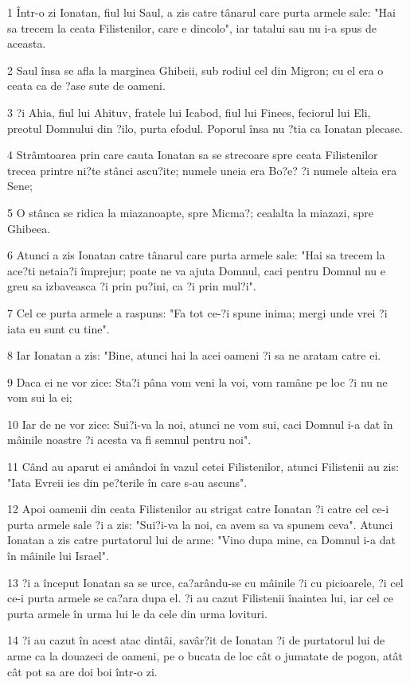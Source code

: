\par 1 Într-o zi Ionatan, fiul lui Saul, a zis catre tânarul care purta armele sale: "Hai sa trecem la ceata Filistenilor, care e dincolo", iar tatalui sau nu i-a spus de aceasta.
\par 2 Saul însa se afla la marginea Ghibeii, sub rodiul cel din Migron; cu el era o ceata ca de ?ase sute de oameni.
\par 3 ?i Ahia, fiul lui Ahituv, fratele lui Icabod, fiul lui Finees, feciorul lui Eli, preotul Domnului din ?ilo, purta efodul. Poporul însa nu ?tia ca Ionatan plecase.
\par 4 Strâmtoarea prin care cauta Ionatan sa se strecoare spre ceata Filistenilor trecea printre ni?te stânci ascu?ite; numele uneia era Bo?e? ?i numele alteia era Sene;
\par 5 O stânca se ridica la miazanoapte, spre Micma?; cealalta la miazazi, spre Ghibeea.
\par 6 Atunci a zis Ionatan catre tânarul care purta armele sale: "Hai sa trecem la ace?ti netaia?i împrejur; poate ne va ajuta Domnul, caci pentru Domnul nu e greu sa izbaveasca ?i prin pu?ini, ca ?i prin mul?i".
\par 7 Cel ce purta armele a raspuns: "Fa tot ce-?i spune inima; mergi unde vrei ?i iata eu sunt cu tine".
\par 8 Iar Ionatan a zis: "Bine, atunci hai la acei oameni ?i sa ne aratam catre ei.
\par 9 Daca ei ne vor zice: Sta?i pâna vom veni la voi, vom ramâne pe loc ?i nu ne vom sui la ei;
\par 10 Iar de ne vor zice: Sui?i-va la noi, atunci ne vom sui, caci Domnul i-a dat în mâinile noastre ?i acesta va fi semnul pentru noi".
\par 11 Când au aparut ei amândoi în vazul cetei Filistenilor, atunci Filistenii au zis: "Iata Evreii ies din pe?terile în care s-au ascuns".
\par 12 Apoi oamenii din ceata Filistenilor au strigat catre Ionatan ?i catre cel ce-i purta armele sale ?i a zis: "Sui?i-va la noi, ca avem sa va spunem ceva". Atunci Ionatan a zis catre purtatorul lui de arme: "Vino dupa mine, ca Domnul i-a dat în mâinile lui Israel".
\par 13 ?i a început Ionatan sa se urce, ca?arându-se cu mâinile ?i cu picioarele, ?i cel ce-i purta armele se ca?ara dupa el. ?i au cazut Filistenii înaintea lui, iar cel ce purta armele în urma lui le da cele din urma lovituri.
\par 14 ?i au cazut în acest atac dintâi, savâr?it de Ionatan ?i de purtatorul lui de arme ca la douazeci de oameni, pe o bucata de loc cât o jumatate de pogon, atât cât pot sa are doi boi într-o zi.

